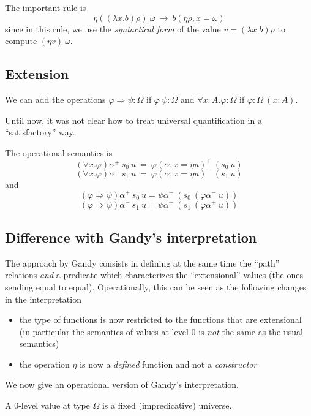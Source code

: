 \documentclass[10pt,a4paper]{article}
\begin{document}
 The important rule is
$$
\eta ((\lambda x.b)\rho)~\omega ~\rightarrow~ b(\eta\rho,x=\omega)
$$
since in this rule, we use the {\em syntactical form} of the value $v = (\lambda x.b)\rho$
to compute $(\eta v)~\omega$.


\subsection{Extension}

 We can add the operations $\varphi\Rightarrow\psi:\Omega$ if $\varphi~\psi:\Omega$
and $\forall x:A.\varphi:\Omega$ if $\varphi:\Omega~(x:A)$.

\medskip

 Until now, it was not clear how to treat universal quantification in a ``satisfactory'' way.

\medskip

 The operational semantics is
$$
(\forall x.\varphi)\alpha^+~s_0~u ~=~\varphi(\alpha,x = \eta u)^+~(s_0~ u)
$$
$$
(\forall x.\varphi)\alpha^-~s_1~u ~=~\varphi(\alpha,x = \eta u)^-~(s_1~ u)
$$
and
$$
(\varphi\Rightarrow\psi)\alpha^+~s_0~u = \psi\alpha^+~(s_0~(\varphi\alpha^-~u))
$$
$$
(\varphi\Rightarrow\psi)\alpha^-~s_1~u = \psi\alpha^-~(s_1~(\varphi\alpha^+~u))
$$


\subsection{Difference with Gandy's interpretation}

 The approach by Gandy consists in defining at the same time the ``path'' relations 
{\em and} a predicate which characterizes the ``extensional'' values (the ones sending
equal to equal). Operationally, this can be seen as the following changes in the interpretation
\begin{itemize}
\item the type of functions is now restricted to the functions that are extensional
(in particular the semantics of values at level $0$ is {\em not} the same as the usual semantics)
\item the operation $\eta$ is now a {\em defined} function and not a {\em constructor}
\end{itemize}

 We now give an operational version of Gandy's interpretation.

\medskip

  A $0$-level value at type $\Omega$ is a fixed (impredicative) universe.
\end{document}
